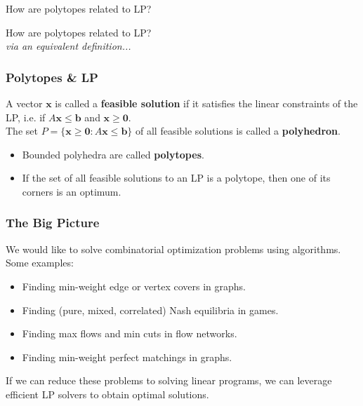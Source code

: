 \begin{frame}
\begin{center}
\Large How are polytopes related to LP?
\end{center}
\end{frame}

\begin{frame}
\begin{center}
	{\Large How are polytopes related to LP?} \\
	\vspace{0.3cm}
	\emph{via an equivalent definition...} 
\end{center}
\end{frame}

\begin{frame}
\frametitle{Polytopes \& LP}
A vector \( \mathbf{x} \) is called a \textbf{feasible solution} if it satisfies the linear constraints of the LP, i.e. if \( A \mathbf{x} \leq \mathbf{b} \) and \( \mathbf{x} \geq \mathbf{0} \).\\

\vspace{0.3cm} The set \( P = \{ \mathbf{x} \geq \mathbf{0} : A\mathbf{x} \leq \mathbf{b} \}  \) of all feasible solutions is called a \textbf{polyhedron}. 
\begin{itemize}
	\item Bounded polyhedra are called \textbf{polytopes}.
	\item If the set of all feasible solutions to an LP is a polytope, then one of its corners is an optimum.
\end{itemize}
\end{frame}

\begin{frame}
\frametitle{The Big Picture}
We would like to solve combinatorial optimization problems using algorithms.\\

\vspace{0.3cm}
Some examples:
\begin{itemize}
	\item Finding min-weight edge or vertex covers in graphs.
	\item Finding (pure, mixed, correlated) Nash equilibria in games.
	\item Finding max flows and min cuts in flow networks.
	\item Finding min-weight perfect matchings in graphs.
\end{itemize}
\vspace{0.3cm}
If we can reduce these problems to solving linear programs, we can leverage efficient LP solvers to obtain optimal solutions.
\end{frame}


